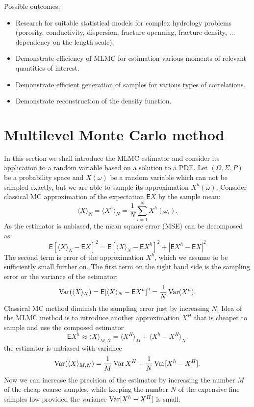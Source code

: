 \documentclass{article}
\def \E{{\mathsf E}}
\def\avg#1{\langle#1\rangle}
\def\Var{\mathop{\rm Var}}
\def\abs#1{|#1|}
\begin{document}
Possible outcomes:
\begin{itemize}
    \item Research for suitable statistical models for complex hydrology problems (porosity, conductivity, dispersion, fracture openning, fracture density, ... dependency on the length scale).
    \item Demonstrate efficiency of MLMC for estimation various moments of relevant quantities of interest.
    \item Demonstrate efficient generation of samples for various types of correlations.
    \item Demonstrate reconstruction of the density function.
\end{itemize}

\section{Multilevel Monte Carlo method}
In this section we shall introduce the MLMC estimator and consider its application to a random variable based on a solution to a PDE.
Let $(\Omega, \Sigma, P)$ be a probability space and $X(\omega)$ be a random variable
which can not be sampled exactly, but we are able to sample its approximation $X^h(\omega)$. 
Consider classical MC approximation of the expectation $\E X$ by the sample mean:
\[
    \avg{X}_N = \avg{X^h}_N = \frac{1}{N}\sum_{i=1}^{N} X^h(\omega_i).
\]
As the estimator is unbiased, the mean square error (MSE) can be decomposed as:
\begin{equation}
    \label{eq:mc_mse}
    \E[\avg{X}_N - \E X]^2 = \E[\avg{X}_N - \E X^h ]^2 + \abs{\E X^h - \E X}^2
\end{equation}
The second term is error of the approximation $X^h$, which we assume to be sufficiently small further on.
The first term on the right hand side is the sampling error or the variance of the estimator:
\[
    \Var(\avg{X}_N) = \E[\avg{X}_N - \E X^h ]^2 = \frac{1}{N}\Var(X^h).
\]
 Classical MC method diminish the sampling error just by increasing $N$. Idea of the MLMC method is to introduce another approximation $X^H$ that is cheaper to sample and use the composed estimator
\[
	\E X^h \approx \avg{X}_{M,N} = \avg{X^H}_M	 + \avg{X^h - X^H}_N. 
\]
the estimator is unbiased with variance
\[
	\Var(\avg{X}_{M,N}) =  \frac{1}{M}\Var{X^H} + \frac{1}{N}\Var[X^h-X^H]. 
\]
Now we can increase the precision of the estimator by increasing the number $M$ of the cheap coarse samples, while keeping the number $N$ of the expensive fine samples low provided the variance
$\Var[X^h-X^H]$ is small. 
\end{document}
